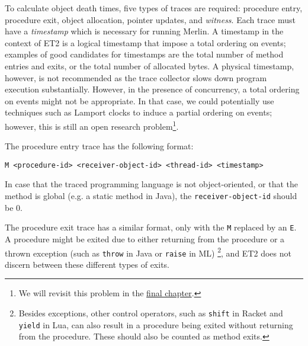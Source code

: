 To calculate object death times, five types of traces are required: procedure entry, procedure exit, object allocation, pointer updates, and \emph{witness}. Each trace must have a \emph{timestamp} which is necessary for running Merlin. A timestamp in the context of
ET2 is a logical timestamp that impose a total ordering on events; examples of good candidates for timestamps are the total number of 
method entries and exits, or the total number of allocated bytes. A physical timestamp, however, is not recommended as the trace
collector slows down program execution substantially. However, in the presence of concurrency, a total ordering on events might not be
appropriate. In that case, we could potentially use techniques such as Lamport clocks \citep{LamportClock} to induce a partial ordering
on events; however, this is still an open research problem\footnote{We will revisit this problem in the
\hyperref[chap:conclusion]{final chapter}.}.

The procedure entry trace has the following format:

\begin{verbatim}
M <procedure-id> <receiver-object-id> <thread-id> <timestamp>
\end{verbatim}

In case that the traced programming language is not object-oriented, or that the method is global (e.g. a static method in Java), the
\lstinline{receiver-object-id} should be 0. 

The procedure exit trace has a similar format, only with the \lstinline{M} replaced by an \lstinline{E}. A procedure might be
exited due to either returning from the procedure or a thrown exception (such as \lstinline{throw} in Java or \lstinline{raise} in ML)
\footnote{Besides exceptions, other control operators, such as \lstinline{shift} in Racket and
  \lstinline{yield} in Lua, can also result in a procedure being exited without returning from the procedure. These should also be
  counted as method exits.}, and ET2 does not discern between these different types of exits.

